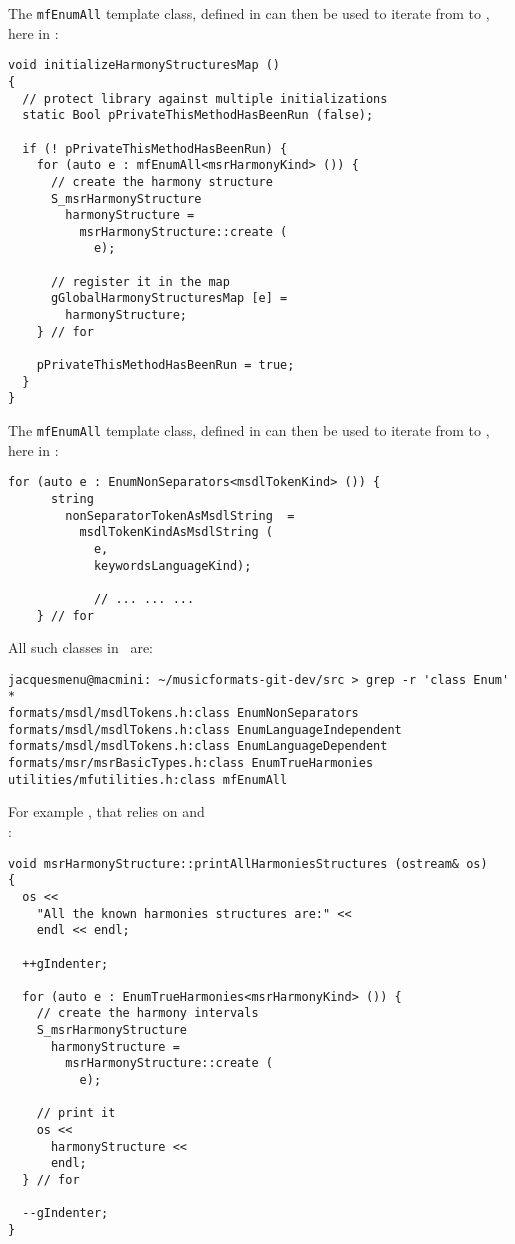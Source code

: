 The {\tt mfEnumAll} template class, defined in  can then be used to iterate from  to , here in :
\begin{lstlisting}[language=CPlusPlus]
void initializeHarmonyStructuresMap ()
{
  // protect library against multiple initializations
  static Bool pPrivateThisMethodHasBeenRun (false);

  if (! pPrivateThisMethodHasBeenRun) {
    for (auto e : mfEnumAll<msrHarmonyKind> ()) {
      // create the harmony structure
      S_msrHarmonyStructure
        harmonyStructure =
          msrHarmonyStructure::create (
            e);

      // register it in the map
      gGlobalHarmonyStructuresMap [e] =
        harmonyStructure;
    } // for

    pPrivateThisMethodHasBeenRun = true;
  }
}
\end{lstlisting}

The {\tt mfEnumAll} template class, defined in  can then be used to iterate from  to , here in :
\begin{lstlisting}[language=CPlusPlus]
    for (auto e : EnumNonSeparators<msdlTokenKind> ()) {
      string
        nonSeparatorTokenAsMsdlString  =
          msdlTokenKindAsMsdlString (
            e,
            keywordsLanguageKind);

			// ... ... ...
    } // for
\end{lstlisting}

All such  classes in \mf\ are:
\begin{lstlisting}[language=Terminal]
jacquesmenu@macmini: ~/musicformats-git-dev/src > grep -r 'class Enum' *
formats/msdl/msdlTokens.h:class EnumNonSeparators
formats/msdl/msdlTokens.h:class EnumLanguageIndependent
formats/msdl/msdlTokens.h:class EnumLanguageDependent
formats/msr/msrBasicTypes.h:class EnumTrueHarmonies
utilities/mfutilities.h:class mfEnumAll
\end{lstlisting}

For example , that relies on  and\\
 :
\begin{lstlisting}[language=CPlusPlus]
void msrHarmonyStructure::printAllHarmoniesStructures (ostream& os)
{
  os <<
    "All the known harmonies structures are:" <<
    endl << endl;

  ++gIndenter;

  for (auto e : EnumTrueHarmonies<msrHarmonyKind> ()) {
    // create the harmony intervals
    S_msrHarmonyStructure
      harmonyStructure =
        msrHarmonyStructure::create (
          e);

    // print it
    os <<
      harmonyStructure <<
      endl;
  } // for

  --gIndenter;
}
\end{lstlisting}


